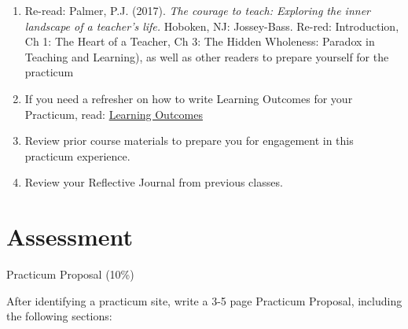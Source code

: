 \documentclass[
]{book}
\providecommand{\tightlist}{%
  \setlength{\itemsep}{0pt}\setlength{\parskip}{0pt}}
\begin{document}
\begin{reflect}
\begin{enumerate}
\def\labelenumi{\arabic{enumi}.}
\tightlist
\item
  Re-read: Palmer, P.J. (2017). \emph{The courage to teach: Exploring the inner landscape of a teacher's life.} Hoboken, NJ: Jossey-Bass. Re-red: Introduction, Ch 1: The Heart of a Teacher, Ch 3: The Hidden Wholeness: Paradox in Teaching and Learning), as well as other readers to prepare yourself for the practicum\\
\item
  If you need a refresher on how to write Learning Outcomes for your Practicum, read: \href{https://teaching.uwo.ca/curriculum/coursedesign/learning-outcomes.html}{Learning Outcomes}\\
\item
  Review prior course materials to prepare you for engagement in this practicum experience.\\
\item
  Review your Reflective Journal from previous classes.
\end{enumerate}
\end{reflect}

\hypertarget{assessment}{%
\section*{Assessment}\label{assessment}}

{Practicum Proposal (10\%)}

After identifying a practicum site, write a 3-5 page Practicum Proposal, including the following sections:
\end{document}
